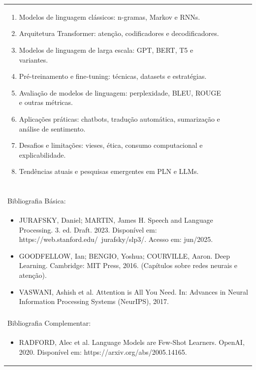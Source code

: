 \documentclass[11pt]{article}
\begin{document}
\begin{center}
\begin{longtable}{|p{4cm}|p{4cm}|p{4cm}|p{4cm}|}
{\begin{enumerate}
\item Modelos de linguagem clássicos: n-gramas, Markov e RNNs.
\item Arquitetura Transformer: atenção, codificadores e decodificadores.
\item Modelos de linguagem de larga escala: GPT, BERT, T5 e variantes.
\item Pré-treinamento e fine-tuning: técnicas, datasets e estratégias.
\item Avaliação de modelos de linguagem: perplexidade, BLEU, ROUGE e outras métricas.
\item Aplicações práticas: chatbots, tradução automática, sumarização e análise de sentimento.
\item Desafios e limitações: vieses, ética, consumo computacional e explicabilidade.
\item Tendências atuais e pesquisas emergentes em PLN e LLMs.\end{enumerate}}\\
\multicolumn{4}{|p{16cm}|}{}\\
\multicolumn{4}{|p{16cm}|}{}\\
\multicolumn{4}{|p{16cm}|}{\vspace{-1cm}}\\
\multicolumn{4}{|p{16cm}|}{}\\
\hline
\multicolumn{4}{|p{16cm}|}{Bibliografia Básica:}\\
\multicolumn{4}{|p{16cm}|}{%
\begin{itemize}\item JURAFSKY, Daniel; MARTIN, James H. Speech and Language Processing. 3. ed. Draft. 2023. Disponível em: https://web.stanford.edu/~jurafsky/slp3/. Acesso em: jun/2025.
\item GOODFELLOW, Ian; BENGIO, Yoshua; COURVILLE, Aaron. Deep Learning. Cambridge: MIT Press, 2016. (Capítulos sobre redes neurais e atenção).
\item VASWANI, Ashish et al. Attention is All You Need. In: Advances in Neural Information Processing Systems (NeurIPS), 2017.\end{itemize}}\\
\multicolumn{4}{|p{16cm}|}{}\\
\hline
\multicolumn{4}{|p{16cm}|}{Bibliografia Complementar:}\\
\multicolumn{4}{|p{16cm}|}{%
\begin{itemize}\item RADFORD, Alec et al. Language Models are Few-Shot Learners. OpenAI, 2020. Disponível em: https://arxiv.org/abs/2005.14165.

\end{itemize}}
\end{longtable}
\end{center}
\end{document}

